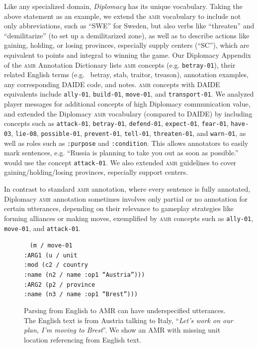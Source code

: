 \documentclass[oneside]{memoir}
\newcommand{\amr}[1]{\texttt{#1}}
\newcommand{\abr}[1]{\textsc{#1}}
\begin{document}
%
Like any specialized domain, \textit{Diplomacy} has its unique
vocabulary.
%
Taking the above statement as an example, we extend the \abr{amr}
vocabulary to include not only abbreviations, such as ``SWE'' for
Sweden, but also verbs like ``threaten'' and ``demilitarize'' (to set
up a demilitarized zone), as well as to describe actions like gaining,
holding, or losing provinces, especially supply centers (``SC''),
which are equivalent to points and integral to winning the game. Our Diplomacy Appendix of the \abr{amr} Annotation Dictionary lists \abr{amr} concepts (e.g. \amr{betray-01}), their related English terms (e.g. \ betray, stab, traitor, treason), annotation examples, any corresponding DAIDE code, and notes. \abr{amr} concepts with DAIDE equivalents include \amr{ally-01}, \amr{build-01}, \amr{move-01}, and \amr{transport-01}. We analyzed player messages for additional concepts of high Diplomacy communication value, and extended the Diplomacy \abr{amr} vocabulary (compared to DAIDE) by including concepts such as \amr{attack-01}, \amr{betray-01}, \amr{defend-01}, \amr{expect-01}, \amr{fear-01}, \amr{have-03}, \amr{lie-08}, \amr{possible-01}, \amr{prevent-01}, \amr{tell-01}, \amr{threaten-01}, and \amr{warn-01}, as well as roles such as \amr{:purpose} and \amr{:condition}. This allows annotators to easily mark sentences, e.g. ``Russia is planning to take you out as soon as possible.'' would use the concept \amr{attack-01}. We also extended \abr{amr} guidelines to cover gaining/holding/losing provinces, especially support centers.

In contrast to standard \abr{amr} annotation, where every sentence is fully annotated, Diplomacy \abr{amr} annotation sometimes involves only partial or no annotation for certain utterances, depending on their relevance to gameplay strategies like forming alliances or making moves, exemplified by \abr{amr} concepts such as \amr{ally-01}, \amr{move-01}, and \amr{attack-01}.
%
\begin{figure}[h]
\
    \small{ \texttt{(m / move-01\\
    \hspace*{4 mm}:ARG1 (u / unit\\
    \hspace*{8 mm}:mod (c2 / country\\ 
    \hspace*{16 mm}:name (n2 / name :op1 ``Austria'')))\\
    \hspace*{4 mm}:ARG2 (p2 / province\\ 
    \hspace*{8 mm}:name (n3 / name :op1 ``Brest'')))\\}}
    \caption{\label{fig:amr_loc}Parsing from English to \abr{AMR} can have underspecified utterances. The English text is from Austria talking to Italy, ``\textit{Let's work on our plan, I'm moving to Brest}''. We show an \abr{AMR} with missing unit location referencing from English text.}
\end{figure}
\end{document}
